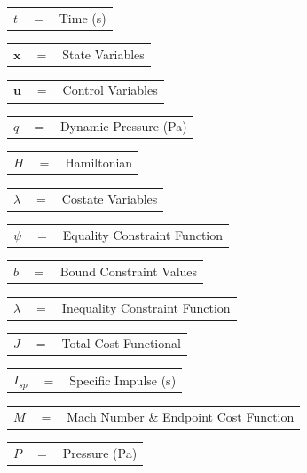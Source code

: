 \noindent
\begin{tabular}{p{1.2cm}p{1cm}p{5cm}}
	$t$ & $=$ & Time (s)\\
\end{tabular} 
\begin{tabular}{p{1.2cm}p{1cm}p{5cm}}
	$\textbf{x}$& $=$ & State Variables\\
\end{tabular} 
\begin{tabular}{p{1.2cm}p{1cm}p{5cm}}
	$\textbf{u}$& $=$ & Control Variables\\
\end{tabular} 
\begin{tabular}{p{1.2cm}p{1cm}p{5cm}}
	$q$ & $=$ & Dynamic Pressure (Pa)\\
\end{tabular} 
\begin{tabular}{p{1.2cm}p{1cm}p{5cm}}
	$H$ & $=$ & Hamiltonian\\
\end{tabular}
\begin{tabular}{p{1.2cm}p{1cm}p{5cm}}
	$\lambda$ & $=$ & Costate Variables\\
\end{tabular}
\begin{tabular}{p{1.2cm}p{1cm}p{5cm}}
	$\psi$ & $=$ & Equality Constraint Function\\
\end{tabular}
\begin{tabular}{p{1.2cm}p{1cm}p{5cm}}
	$b$ & $=$ & Bound Constraint Values\\
\end{tabular}
\begin{tabular}{p{1.2cm}p{1cm}p{5cm}}
	$\lambda$ & $=$ & Inequality Constraint Function\\
\end{tabular}
\begin{tabular}{p{1.2cm}p{1cm}p{5cm}}
	$J$ & $=$ & Total Cost Functional\\
\end{tabular}
\begin{tabular}{p{1.2cm}p{1cm}p{5cm}}
	$I_{sp}$ & $=$ & Specific Impulse (s)\\ 
\end{tabular} 
\begin{tabular}{p{1.2cm}p{1cm}p{5cm}}
	$M$ & $=$ & Mach Number \& Endpoint Cost Function\\
\end{tabular}
\begin{tabular}{p{1.2cm}p{1cm}p{5cm}}
	$P$ & $=$ & Pressure (Pa)  \\
\end{tabular}
